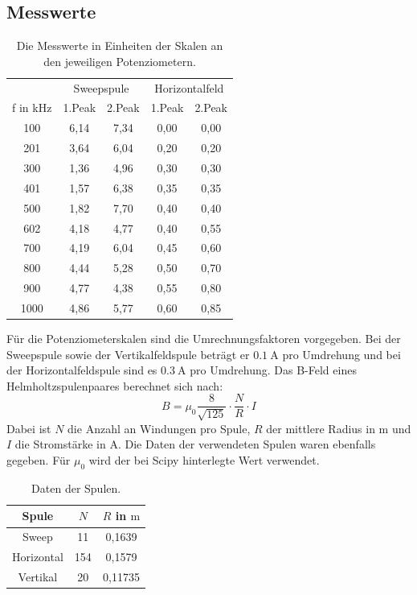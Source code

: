 \documentclass[
  bibliography=totoc,     %
  captions=tableheading,  %
  titlepage=firstiscover, %
]{scrartcl}
\begin{document}
\subsection{Messwerte}
\begin{table}[H]
  \centering
  \caption{Die Messwerte in Einheiten der Skalen an den jeweiligen Potenziometern.}
  \label{tab:1}
  \begin{tabular}{c c c c c}
    \toprule
    & \multicolumn{2}{c}{Sweepspule} & \multicolumn{2}{c}{Horizontalfeld}\\
    f in \si{\kilo\hertz} & 1.Peak & 2.Peak & 1.Peak & 2.Peak \\
    \midrule
    100  & 6,14 & 7,34 & 0,00 & 0,00 \\
    201  & 3,64 & 6,04 & 0,20 & 0,20 \\
    300  & 1,36 & 4,96 & 0,30 & 0,30 \\
    401  & 1,57 & 6,38 & 0,35 & 0,35 \\
    500  & 1,82 & 7,70 & 0,40 & 0,40 \\
    602  & 4,18 & 4,77 & 0,40 & 0,55 \\
    700  & 4,19 & 6,04 & 0,45 & 0,60 \\
    800  & 4,44 & 5,28 & 0,50 & 0,70 \\
    900  & 4,77 & 4,38 & 0,55 & 0,80 \\
    1000 & 4,86 & 5,77 & 0,60 & 0,85 \\
    \bottomrule
  \end{tabular}
\end{table}
Für die Potenziometerskalen sind die Umrechnungsfaktoren vorgegeben.
Bei der Sweepspule sowie der Vertikalfeldspule beträgt er $\SI{0.1}{\ampere}$ pro Umdrehung und bei
der Horizontalfeldspule sind es $\SI{0.3}{\ampere}$ pro Umdrehung.
Das B-Feld eines Helmholtzspulenpaares berechnet sich nach:
\begin{equation}
  B = \mu_0 \frac{8}{\sqrt{125}}\cdot \frac{N}{R} \cdot I
\end{equation}
Dabei ist $N$ die Anzahl an Windungen pro Spule, $R$ der mittlere Radius in $\si{\meter}$
und $I$ die Stromstärke in $\si{\ampere}$. Die Daten der verwendeten Spulen waren
ebenfalls gegeben. Für $\mu_0$ wird der bei Scipy \cite{scipy} hinterlegte Wert verwendet.
\begin{table}[H]
  \centering
  \caption{Daten der Spulen.}
  \label{tab:2}
  \begin{tabular}{c c c}
    \toprule
    Spule & $N$ & $R$ in $\si{\meter}$ \\
    \midrule
    Sweep       &  11 & 0,1639 \\
    Horizontal  & 154 & 0,1579 \\
    Vertikal    &  20 & 0,11735 \\
    \bottomrule
  \end{tabular}
\end{table}
\end{document}
